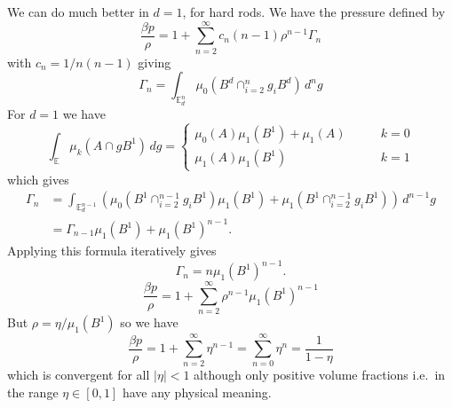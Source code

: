 We can do much better in $d=1$, for hard rods.
We have the pressure defined by
\begin{equation}
  \frac{\beta p}{\rho} =
  1 + \sum_{n=2}^\infty c_n (n-1) \rho^{n-1} \Gamma_n
\end{equation}
with $c_n = 1/n(n-1)$  giving
\begin{equation}
  \Gamma_n = \int_{\mathbb{E}_d^n} \mu_0 (B^d \cap_{i=2}^n g_i B^d) \, d^n g
\end{equation}
For $d=1$ we have
\begin{equation}
  \int_{\mathbb{E}} \mu_k (A \cap g B^1) \, dg =
  \begin{cases}
    \mu_0(A) \mu_1(B^1) + \mu_1(A) & \qquad k=0 \\
    \mu_1(A) \mu_1(B^1) & \qquad k=1
  \end{cases}
\end{equation}
which gives
\begin{equation}
  \begin{split}
    \Gamma_n &= \int_{\mathbb{E}_d^{n-1}} \left(
    \mu_0 (B^1 \cap_{i=2}^{n-1} g_i B^1) \mu_1(B^1) +
    \mu_1 (B^1 \cap_{i=2}^{n-1} g_i B^1)
    \right) \, d^{n-1} g \\
    &= \Gamma_{n-1} \mu_1(B^1) + \mu_1(B^1)^{n-1}.
  \end{split}
\end{equation}
Applying this formula iteratively gives
\begin{equation}
  \Gamma_n = n \mu_1(B^1)^{n-1}.
\end{equation}
\begin{equation}
  \frac{\beta p}{\rho} =
  1 + \sum_{n=2}^\infty \rho^{n-1} \mu_1(B^1)^{n-1}
\end{equation}
But $\rho = \eta / \mu_1(B^1)$ so we have
\begin{equation}
  \frac{\beta p}{\rho} =
  1 + \sum_{n=2}^\infty \eta^{n-1} = 
  \sum_{n=0}^\infty \eta^{n} = \frac{1}{1 - \eta}
\end{equation}
which is convergent for all $|\eta| < 1$ although only positive volume fractions i.e.\ in the range $\eta \in [0,1]$ have any physical meaning.

